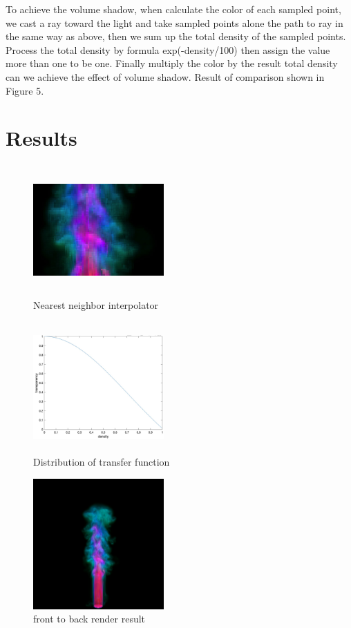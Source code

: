 \documentclass[acmtog]{acmart}
\begin{document}
To achieve the volume shadow, when calculate the color of each sampled point, we cast a ray toward the light and take sampled points alone the path to ray in the same way as above, then we sum up the total density of the sampled points. Process the total density by formula exp(-density/100) then assign the value more than one to be one. Finally multiply the color by the result total density can we achieve the effect of volume shadow. Result of comparison shown in Figure 5.
\section{Results}


\begin{figure}[h]
\centering
\includegraphics[width=5cm,height=5cm]{nearest neighbour.jpg}
\caption{ Nearest neighbor interpolator}
\end{figure}

\begin{figure}[h]
	\centering
	\includegraphics[width=5cm,height=5cm]{distribution.jpg}
	\caption{Distribution of transfer function}
\end{figure}

\begin{figure}[h]
	\centering
	\includegraphics[width=5cm,height=5cm]{foward_pre_noshadow.png}
	\caption{front to back render result}
\end{figure}
\end{document}
